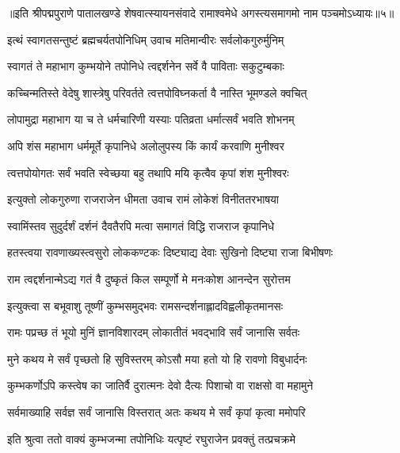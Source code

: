 ॥इति श्रीपद्मपुराणे पातालखण्डे शेषवात्स्यायनसंवादे रामाश्वमेधे अगस्त्यसमागमो नाम पञ्चमोऽध्यायः॥५॥



\twolineshloka
{इत्थं स्वागतसन्तुष्टं ब्रह्मचर्यतपोनिधिम्}
{उवाच मतिमान्वीरः सर्वलोकगुरुर्मुनिम्}%

\twolineshloka
{स्वागतं ते महाभाग कुम्भयोने तपोनिधे}
{त्वद्दर्शनेन सर्वे वै पाविताः सकुटुम्बकाः}%

\twolineshloka
{कच्चिन्मतिस्ते वेदेषु शास्त्रेषु परिवर्तते}
{त्वत्तपोविघ्नकर्ता वै नास्ति भूमण्डले क्वचित्}%

\twolineshloka
{लोपामुद्रा महाभाग या च ते धर्मचारिणी}
{यस्याः पतिव्रता धर्मात्सर्वं भवति शोभनम्}%

\twolineshloka
{अपि शंस महाभाग धर्ममूर्ते कृपानिधे}
{अलोलुपस्य किं कार्यं करवाणि मुनीश्वर}%

\twolineshloka
{त्वत्तपोयोगतः सर्वं भवति स्वेच्छया बहु}
{तथापि मयि कृत्वैव कृपां शंश मुनीश्वरः}%


\twolineshloka
{इत्युक्तो लोकगुरुणा राजराजेन धीमता}
{उवाच रामं लोकेशं विनीततरभाषया}%


\twolineshloka
{स्वामिंस्तव सुदुर्दर्शं दर्शनं दैवतैरपि}
{मत्वा समागतं विद्धि राजराज कृपानिधे}%

\twolineshloka
{हतस्त्वया रावणाख्यस्त्वसुरो लोककण्टकः}
{दिष्ट्याद्य देवाः सुखिनो दिष्ट्या राजा बिभीषणः}%

\twolineshloka
{राम त्वद्दर्शनान्मेऽद्य गतं वै दुष्कृतं किल}
{सम्पूर्णो मे मनःकोश आनन्देन सुरोत्तम}%

\twolineshloka
{इत्युक्त्वा स बभूवाशु तूष्णीं कुम्भसमुद्भवः}
{रामसन्दर्शनाह्लादविह्वलीकृतमानसः}%

\twolineshloka
{रामः पप्रच्छ तं भूयो मुनिं ज्ञानविशारदम्}
{लोकातीतं भवद्भावि सर्वं जानासि सर्वतः}%

\twolineshloka
{मुने कथय मे सर्वं पृच्छतो हि सुविस्तरम्}
{कोऽसौ मया हतो यो हि रावणो विबुधार्दनः}%

\twolineshloka
{कुम्भकर्णोऽपि कस्त्वेष का जातिर्वै दुरात्मनः}
{देवो दैत्यः पिशाचो वा राक्षसो वा महामुने}%

\twolineshloka
{सर्वमाख्याहि सर्वज्ञ सर्वं जानासि विस्तरात्}
{अतः कथय मे सर्वं कृपां कृत्वा ममोपरि}%

\twolineshloka
{इति श्रुत्वा ततो वाक्यं कुम्भजन्मा तपोनिधिः}
{यत्पृष्टं रघुराजेन प्रवक्तुं तत्प्रचक्रमे}%

